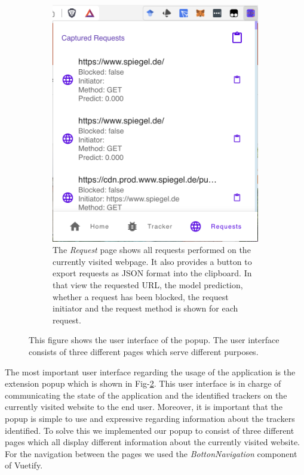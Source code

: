 \begin{figure}[ht!]
\begin{subfigure}[b]{.30\textwidth}
      \includegraphics[width=\linewidth, keepaspectratio]{images/Requests.png}
      \caption{The \emph{Request} page shows all requests performed on the currently visited webpage. It also provides a button to export
      requests as JSON format into the clipboard. In that view the requested URL, the model prediction, whether a request has been blocked,  the request initiator and the request 
    method is shown for each request.}
      \label{fig:Requests}
  \end{subfigure}
  \caption{This figure shows the user interface of the popup. The user interface consists of three different pages which
  serve different purposes.}
  \label{fig:popup}
\end{figure}  

The most important user interface regarding the usage of the application is the extension popup which is shown in Fig-\ref{fig:popup}.
This user interface is in charge of communicating the state of the application and the identified trackers on the currently visited 
website to the end user. Moreover, it is important that the popup is simple to use and expressive regarding information about the trackers identified.
To solve this we implemented our popup to consist of three different pages which all display different information about the currently
visited website. For the navigation between the pages we used the \emph{BottonNavigation} component of Vuetify.

